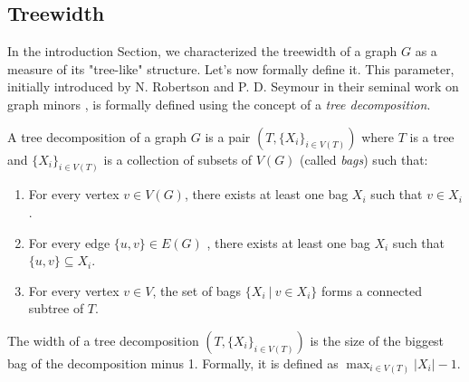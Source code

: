 
\begin{problem}
\end{problem}

\subsection{Treewidth}

In the introduction Section, we characterized the treewidth of a graph $G$ as a measure of its "tree-like" structure. Let's now formally define it. This parameter, initially introduced by N. Robertson and P. D. Seymour in their seminal work on graph minors \cite{robertson1986graph}, is formally defined using the concept of a \textit{tree decomposition}.

\begin{definition}
    A tree decomposition of a graph $G$ is a pair $(T, \{X_i\}_{i \in V(T)})$ where $T$ is a tree and $\{X_i\}_{i \in V(T)}$ is a collection of subsets of $V(G)$ (called \emph{bags}) such that:
    \begin{enumerate}
        \item For every vertex $v \in V(G)$, there exists at least one bag $X_i$ such that $v \in X_i$.
        \item For every edge $\{u, v\} \in E(G)$ , there exists at least one bag $X_i$ such that $\{u, v\} \subseteq X_i$.
        \item For every vertex $v \in V$, the set of bags $\{X_i\ |\ v \in X_i\}$ forms a connected subtree of $T$.
    \end{enumerate}
\end{definition}

\begin{definition}
    The width of a tree decomposition $(T,\{X_i\}_{i \in V(T)})$ is the size of the biggest bag of the decomposition minus 1. Formally, it is defined as $\max_{i \in V(T)} |X_i| - 1$.
\end{definition}

